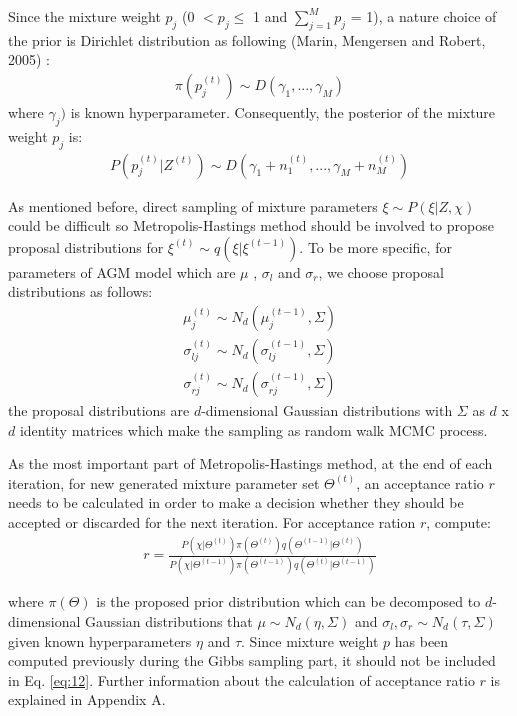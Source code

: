 \documentclass[conference]{llncs}
\begin{document}
Since the mixture weight $p_j$ (0 $< p_j \leq$ 1 and $\sum_{j=1}^Mp_j$ = 1), a nature choice of the prior is Dirichlet distribution as following (Marin, Mengersen and Robert, 2005) \cite{b8}: 
\begin{align}
\pi(p_j^{(t)}) \sim \textit{D}(\gamma_1,...,\gamma_M )
\label{eq:7}
\end{align}
where $\gamma_j)$ is known hyperparameter. Consequently, the posterior of the mixture weight $p_j$ is:
\begin{align}
P(p_j^{(t)}|Z^{(t)}) \sim \textit{D}(\gamma_1 + n_1^{(t)},...,\gamma_M + n_M^{(t)})
\label{eq:8}
\end{align}


As mentioned before, direct sampling of mixture parameters $\xi \sim P(\xi|Z,\chi)$ could be difficult so Metropolis-Hastings method should be involved to propose proposal distributions for $\xi^{(t)} \sim q(\xi|\xi^{(t-1)})$. To be more specific, for parameters of AGM model which are $\mu$ , $\sigma_l$ and $\sigma_r$, we choose proposal distributions as follows:
\begin{align}
\mu_j^{(t)} \sim \textit{N}_d(\mu_j^{(t-1)},\Sigma)
\label{eq:9}
\end{align}
\begin{align}
\sigma_{lj}^{(t)} \sim \textit{N}_d(\sigma_{lj}^{(t-1)},\Sigma)
\label{eq:10}
\end{align}
\begin{align}
\sigma_{rj}^{(t)} \sim \textit{N}_d(\sigma_{rj}^{(t-1)},\Sigma)
\label{eq:11}
\end{align}
the proposal distributions are $d$-dimensional Gaussian distributions with $\Sigma$ as $d$ x $d$ identity matrices which make the sampling as random walk MCMC process.

As the most important part of Metropolis-Hastings method, at the end of each iteration, for new generated mixture parameter set $\Theta^{(t)}$, an acceptance ratio $r$ needs to be calculated in order to make a decision whether they should be accepted or discarded for the next iteration. For acceptance ration $r$, compute:
\begin{align}
r = \frac{P(\chi|\Theta^{(t)})\pi(\Theta^{(t)})q(\Theta^{(t-1)}|\Theta^{(t)})}{P(\chi|\Theta^{(t-1)})\pi(\Theta^{(t-1)})q(\Theta^{(t)}|\Theta^{(t-1)})}
\label{eq:12}
\end{align}

where $\pi(\Theta)$ is the proposed prior distribution which can be decomposed to $d$-dimensional Gaussian distributions that $\mu \sim \textit{N}_d(\eta,\Sigma)$ and $\sigma_l, \sigma_r \sim \textit{N}_d(\tau,\Sigma)$ given known hyperparameters $\eta$ and $\tau$. Since mixture weight $p$ has been computed previously during the Gibbs sampling part, it should not be included in Eq. \eqref{eq:12}. Further information about the calculation of acceptance ratio $r$ is explained in Appendix A.
\end{document}
